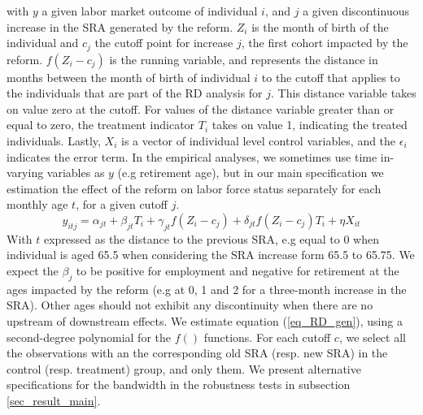 \documentclass[12pt,a4paper]{article}
\begin{document}
\noindent with $y$ a given labor market outcome of individual $i$, and $j$ a given discontinuous increase in the SRA generated by the reform. $Z_{i}$ is the month of birth of the individual and $c_j$ the cutoff point for increase $j$, the first cohort impacted by the reform. $f(Z_{i}-c_j)$ is the running variable, and represents the distance in months between the month of birth of individual $i$ to the cutoff that applies to the individuals that are part of the RD analysis for $j$. This distance variable takes on value zero at the cutoff. For values of the distance variable greater than or equal to zero, the treatment indicator $T_{i}$ takes on value 1, indicating the treated individuals. Lastly, $X_{i}$ is a vector of individual level control variables, and the $\epsilon_{i}$ indicates the error term. 
In the empirical analyses, we sometimes use time in-varying variables as $y$ (e.g retirement age), but in our main specification we estimation the effect of the reform on labor force status separately for each monthly age $t$, for a given cutoff $j$.
\begin{equation}
	\label{eq_RD_age}
	y_{itj} = \alpha_{jt}  + \beta_{jt}  T_{i} + \gamma_{jt} f(Z_{i} - c_j)  + \delta_{jt} f(Z_{i} - c_j) T_{i} + \eta X_{it} %
\end{equation}
With $t$ expressed as the distance to the previous SRA, e.g equal to 0 when individual is aged 65.5 when considering the SRA increase form 65.5 to 65.75. 
We expect the $\beta_{j}$ to be positive for employment and negative for retirement at the ages impacted by the reform (e.g at 0, 1 and 2 for a three-month increase in the SRA). Other ages should not exhibit any discontinuity when there are no upstream of downstream effects. We estimate equation (\ref{eq_RD_gen}), using a second-degree polynomial for the $f()$ functions. For each cutoff $c$, we select all the observations with an the corresponding old SRA (resp. new SRA) in the control (resp. treatment) group, and only them. We present alternative specifications for the bandwidth in the robustness tests in subsection \ref{sec_result_main}.
\end{document}
